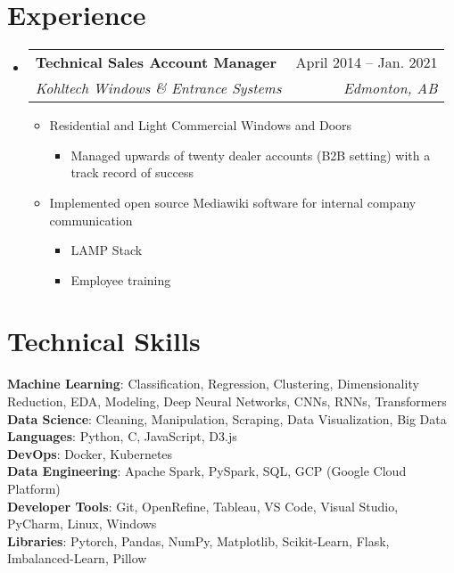 \documentclass[letterpaper,11pt]{article}
\makeatletter
\newcommand{\resumeItem}[1]{
  \item\small{
    {#1 \vspace{-2pt}}
  }
}
\newcommand{\resumeSubheading}[4]{
  \vspace{-2pt}\item
    \begin{tabular*}{0.97\textwidth}[t]{l@{\extracolsep{\fill}}r}
      \textbf{#1} & #2 \\
      \textit{\small#3} & \textit{\small #4} \\
    \end{tabular*}\vspace{-7pt}
}
\newcommand{\resumeSubHeadingListStart}{\begin{itemize}[leftmargin=0.15in, label={}]}
\newcommand{\resumeSubHeadingListEnd}{\end{itemize}}
\newcommand{\resumeItemListStart}{\begin{itemize}}
\newcommand{\resumeItemListEnd}{\end{itemize}\vspace{-5pt}}
\makeatother
\begin{document}
\section{Experience}
  \resumeSubHeadingListStart

    \resumeSubheading
      {Technical Sales Account Manager}{April 2014 -- Jan. 2021}
      {Kohltech Windows \& Entrance Systems}{Edmonton, AB}
      \resumeItemListStart
      \resumeItem{Residential and Light Commercial Windows and Doors}
      	\resumeItemListStart	
        	\resumeItem{Managed upwards of twenty dealer accounts (B2B setting) with a track record of success}
        \resumeItemListEnd
        \setlength{\itemsep}{5pt}
        \resumeItem{Implemented open source Mediawiki software for internal company communication}
        	\resumeItemListStart
            	\resumeItem{LAMP Stack}
                \resumeItem{Employee training}
            \resumeItemListEnd
      \resumeItemListEnd
 
  \resumeSubHeadingListEnd


\section{Technical Skills}
 \begin{itemize}[leftmargin=0.15in, label={}]
    \small{\item{
     \textbf{Machine Learning}{:  Classification, Regression, Clustering, Dimensionality Reduction, EDA, Modeling, Deep Neural Networks, CNNs, RNNs, Transformers} \\
     \textbf{Data Science}{: Cleaning, Manipulation, Scraping, Data Visualization, Big Data } \\
     \textbf{Languages}{: Python, C, JavaScript, D3.js} \\
     {\textbf{DevOps}}{: Docker, Kubernetes } \\
     {\textbf{Data Engineering}}{: Apache Spark, PySpark, SQL, GCP (Google Cloud Platform) } \\
     \textbf{Developer Tools}{: Git, OpenRefine, Tableau, VS Code, Visual Studio, PyCharm, Linux, Windows} \\
     \textbf{Libraries}{: Pytorch, Pandas, NumPy, Matplotlib, Scikit-Learn, Flask, Imbalanced-Learn, Pillow} \\
    }}
 \end{itemize}


\end{document}
